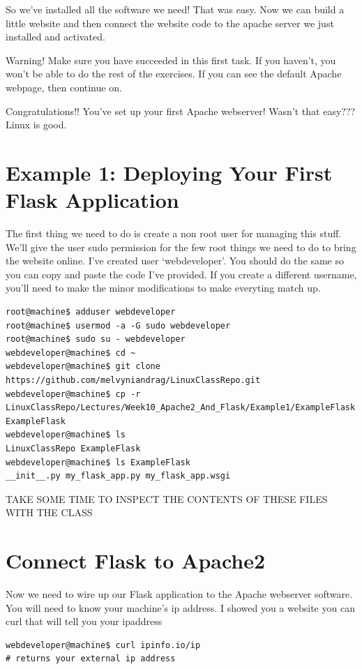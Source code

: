 \documentclass[10pt]{article}
\begin{document}
So we've installed all the software we need! That was easy. Now we can build a little website and then connect the website code to the apache server we just installed and activated.

{\Large \color{red} Warning! Make sure you have succeeded in this first task. If
you haven't, you won't be able to do the rest of the exercises. If you can see
the default Apache webpage, then continue on. }

Congratulations!! You've set up your first Apache webserver! Wasn't that easy???
Linux is good.

\section{Example 1: Deploying Your First Flask Application}
The first thing we need to do is create a non root user for managing this stuff. We'll give the user sudo permission for the few root things we need to do to bring the website online. I've created user `webdeveloper'. You should do the same so you can copy and paste the code I've provided. If you create a different username, you'll need to make the minor modifications to make everyting match up.

\begin{lstlisting}[style=term]
root@machine$ adduser webdeveloper
root@machine$ usermod -a -G sudo webdeveloper
root@machine$ sudo su - webdeveloper
webdeveloper@machine$ cd ~
webdeveloper@machine$ git clone https://github.com/melvyniandrag/LinuxClassRepo.git
webdeveloper@machine$ cp -r
LinuxClassRepo/Lectures/Week10_Apache2_And_Flask/Example1/ExampleFlask ExampleFlask
webdeveloper@machine$ ls
LinuxClassRepo ExampleFlask
webdeveloper@machine$ ls ExampleFlask
__init__.py my_flask_app.py my_flask_app.wsgi
\end{lstlisting}

{\Large TAKE SOME TIME TO INSPECT THE CONTENTS OF THESE FILES  WITH THE CLASS}

\section{Connect Flask to Apache2}
Now we need to wire up our Flask application to the Apache webserver software. You will need to know your machine's ip address. I showed you a website you can curl that will tell you your ipaddress

\begin{lstlisting}[style=term]
webdeveloper@machine$ curl ipinfo.io/ip
# returns your external ip address
\end{lstlisting}
\end{document}
